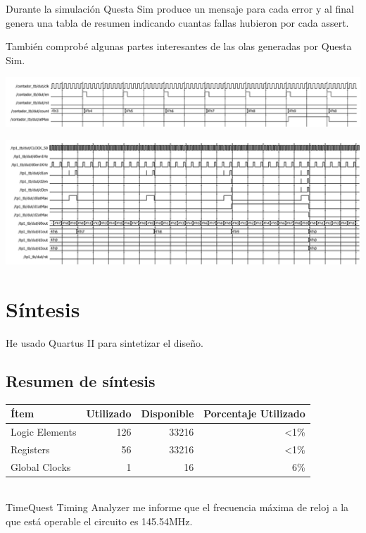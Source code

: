\documentclass[a4paper]{article}
\begin{document}
Durante la simulación Questa Sim produce un mensaje para cada error y al final genera una tabla de resumen indicando cuantas fallas hubieron por cada assert.

También comprobé algunas partes interesantes de las olas generadas por Questa Sim.

\includegraphics[width=15cm]{img/contador_waves.png}

\includegraphics[width=15cm]{img/tp1_waves.png}

\section{Síntesis}

He usado Quartus II para sintetizar el diseño.

\subsection{Resumen de síntesis}
\begin{tabular}{| l | r | r | r|}
\hline
\textbf{Ítem} & \textbf{Utilizado} & \textbf{Disponible} & \textbf{Porcentaje Utilizado} \\ \hline
Logic Elements & 126 & 33216 & \textless 1\% \\
Registers & 56 & 33216 & \textless 1\% \\
Global Clocks & 1 & 16 & 6\% \\ \hline
\end{tabular} \\

TimeQuest Timing Analyzer me informe que el frecuencia máxima de reloj a la que está operable el circuito es 145.54MHz.
\end{document}
